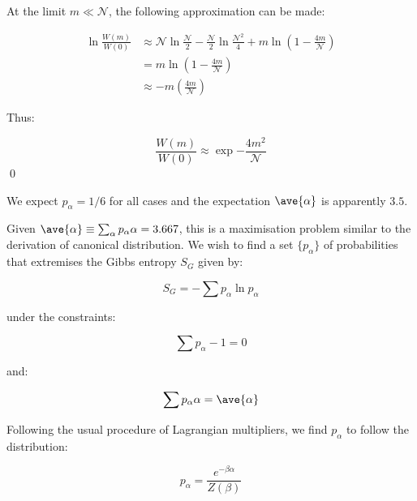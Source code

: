 \documentclass[12pt]{article}
\begin{document}
At the limit $m \ll \mathcal{N}$, the following approximation can be made:

\begin{equation}
    \begin{split}
        \ln{\frac{W(m)}{W(0)}} &\approx \mathcal{N} \ln{\frac{\mathcal{N}}{2}} - \frac{\mathcal{N}}{2} \ln{\frac{\mathcal{N}^{2}}{4}} + m \ln{\left( 1 - \frac{4m}{\mathcal{N}} \right)} \\
        &= m \ln{\left( 1 - \frac{4m}{\mathcal{N}} \right)} \\
        &\approx -m \left( \frac{4m}{\mathcal{N}} \right)
    \end{split}
\end{equation}

Thus:

\begin{equation}
    \frac{W(m)}{W(0)} \approx \exp{-\frac{4m^{2}}{\mathcal{N}}}
\end{equation}
\qed



We expect $p_{\alpha} = 1/6$ for all cases and the expectation $\ave{\alpha}$ is apparently $3.5$.

Given $\ave{\alpha} \equiv \sum_{\alpha} p_{\alpha} \alpha = 3.667$, this is a maximisation problem similar to the derivation of canonical distribution. We wish to find a set $\{p_{\alpha}\}$ of probabilities that extremises the Gibbs entropy $S_{G}$ given by:

\begin{equation}
    S_{G} = - \sum p_{\alpha} \ln{p_{\alpha}}
\end{equation}

under the constraints:

\begin{equation}
    \sum p_{\alpha} - 1 = 0
\end{equation}

and:

\begin{equation}
    \sum p_{\alpha} \alpha = \ave{\alpha}
\end{equation}

Following the usual procedure of Lagrangian multipliers, we find $p_{\alpha}$ to follow the distribution:

\begin{equation}
    p_{\alpha} = \frac{e^{-\beta \alpha}}{Z(\beta)}
\end{equation}
\end{document}

